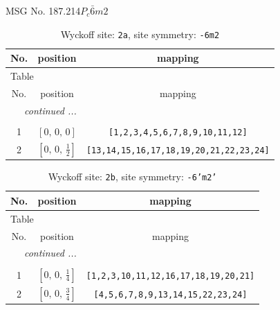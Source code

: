 \documentclass[fleqn,8pt]{jsarticle}
\begin{document}
\setcounter{MaxMatrixCols}{32}

\renewcommand{\tablename}{Table~}
\renewcommand{\figurename}{Figure~}
\begin{center}
\LARGE
MSG No. 187.214\quad$P_{c}\bar{6}m2$
\end{center}
\renewcommand{\arraystretch}{1.2}
\begin{longtable}{ccc}
\caption{Wyckoff site: {\tt 2a}, site symmetry: {\tt -6m2}}
 \\
 \hline \hline
No. & position & mapping \\ \hline \endfirsthead

\multicolumn{2}{l}{\tablename\ \thetable{}} \\
 \hline \hline
No. & position & mapping \\ \hline \endhead

 \hline \hline
\multicolumn{2}{r}{\footnotesize\it continued ...} \\ \endfoot

 \hline \hline
\multicolumn{2}{r}{} \\ \endlastfoot

1 & $\left[ 0,\, 0,\, 0 \right]$ & {\tt [1,2,3,4,5,6,7,8,9,10,11,12]} \\ \hline
2 & $\left[ 0,\, 0,\, \frac{1}{2} \right]$ & {\tt [13,14,15,16,17,18,19,20,21,22,23,24]} \\
\end{longtable}
\renewcommand{\arraystretch}{1.2}
\begin{longtable}{ccc}
\caption{Wyckoff site: {\tt 2b}, site symmetry: {\tt -6'm2'}}
 \\
 \hline \hline
No. & position & mapping \\ \hline \endfirsthead

\multicolumn{2}{l}{\tablename\ \thetable{}} \\
 \hline \hline
No. & position & mapping \\ \hline \endhead

 \hline \hline
\multicolumn{2}{r}{\footnotesize\it continued ...} \\ \endfoot

 \hline \hline
\multicolumn{2}{r}{} \\ \endlastfoot

1 & $\left[ 0,\, 0,\, \frac{1}{4} \right]$ & {\tt [1,2,3,10,11,12,16,17,18,19,20,21]} \\ \hline
2 & $\left[ 0,\, 0,\, \frac{3}{4} \right]$ & {\tt [4,5,6,7,8,9,13,14,15,22,23,24]} \\
\end{longtable}
\end{document}
